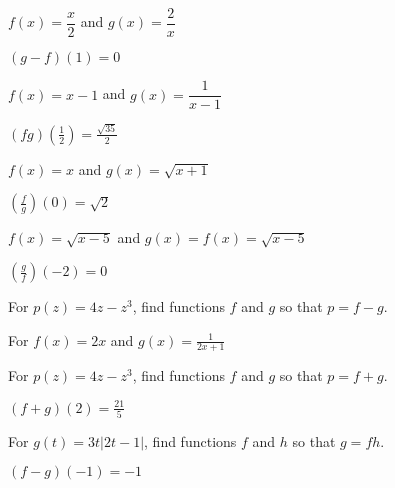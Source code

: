 \documentclass{ximera}
\begin{document}
\begin{question}
$f(x) = \dfrac{x}{2}$ and $g(x) = \dfrac{2}{x}$
\begin{solution}
$(g-f)(1) = 0$

\end{solution}

\end{question}

\begin{question}
$f(x) =x-1$ and $g(x) = \dfrac{1}{x-1}$

\begin{solution}
$(fg)\left(\frac{1}{2}\right) = \frac{\sqrt{35}}{2}$
\end{solution}

\end{question}

\begin{question}
$f(x) = x$ and $g(x) = \sqrt{x+1}$
\begin{solution}
$\left(\frac{f}{g}\right)(0) = \sqrt{2}$
\end{solution}

\end{question}

\begin{question}
$f(x) =\sqrt{x-5}$ and $g(x) = f(x) = \sqrt{x-5}$ 

\begin{solution}
$\left(\frac{g}{f}\right)\left(-2\right) = 0$

\end{solution}

\end{question}

\begin{question}
For $p(z) = 4z-z^3$, find functions $f$ and $g$ so that $p=f-g$.
\begin{solution}
For  $f(x) = 2x$ and  $g(x) = \frac{1}{2x+1}$


\end{solution}

\end{question}

\begin{question}
For $p(z) = 4z-z^3$, find functions $f$ and $g$ so that $p=f+g$.
\begin{solution}
$(f+g)(2) = \frac{21}{5}$
\end{solution}

\end{question}

\begin{question}
For $g(t) = 3t|2t-1|$, find functions $f$ and $h$  so that $g = fh$.
\begin{solution}
$(f-g)(-1) = -1$
\end{solution}

\end{question}
\end{document}
